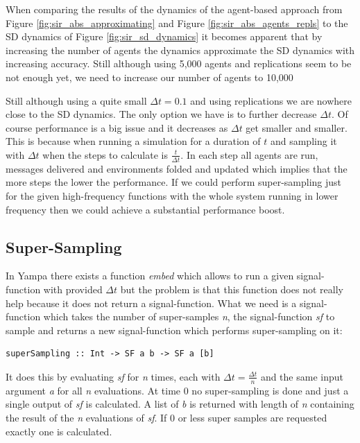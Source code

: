 When comparing the results of the dynamics of the agent-based approach from Figure \ref{fig:sir_abs_approximating} and Figure \ref{fig:sir_abs_agents_repls} to the SD dynamics of Figure \ref{fig:sir_sd_dynamics} it becomes apparent that by increasing the number of agents the dynamics approximate the SD dynamics with increasing accuracy. Still although using 5,000 agents and replications seem to be not enough yet, we need to increase our number of agents to 10,000

Still although using a quite small $\Delta t = 0.1$ and using replications we are nowhere close to the SD dynamics. The only option we have is to further decrease $\Delta t$. Of course performance is a big issue and it decreases as $\Delta t$ get smaller and smaller. This is because when running a simulation for a duration of $t$ and sampling it with $\Delta t$ when the steps to calculate is $\frac{t}{\Delta t}$. In each step all agents are run, messages delivered and environments folded and updated which implies that the more steps the lower the performance. If we could perform super-sampling just for the given high-frequency functions with the whole system running in lower frequency then we could achieve a substantial performance boost.

\subsection{Super-Sampling}
In Yampa there exists a function \textit{embed} which allows to run a given signal-function with provided $\Delta t$ but the problem is that this function does not really help because it does not return a signal-function. What we need is a signal-function which takes the number of super-samples \textit{n}, the signal-function \textit{sf} to sample and returns a new signal-function which performs super-sampling on it:

\begin{verbatim}
superSampling :: Int -> SF a b -> SF a [b]
\end{verbatim}

It does this by evaluating \textit{sf} for \textit{n} times, each with $\Delta t = \frac{\Delta t}{n}$ and the same input argument \textit{a} for all \textit{n} evaluations. At time 0 no super-sampling is done and just a single output of \textit{sf} is calculated. A list of \textit{b} is returned with length of \textit{n} containing the result of the \textit{n} evaluations of \textit{sf}. If 0 or less super samples are requested exactly one is calculated.

